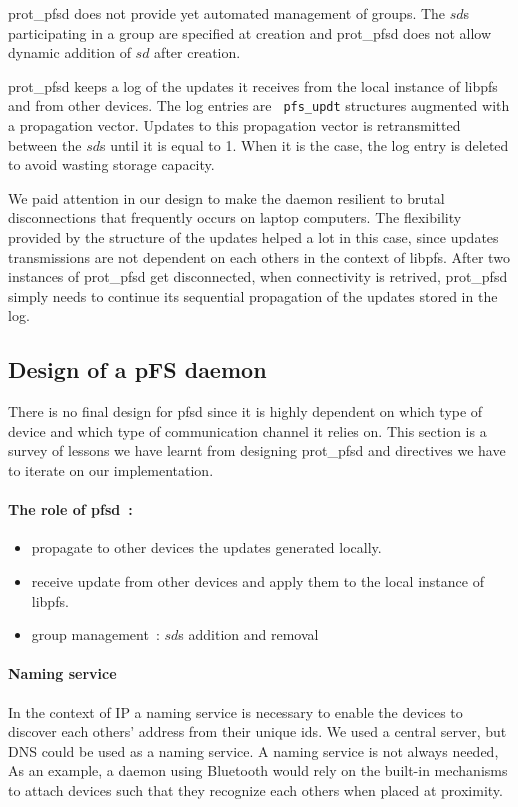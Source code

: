 prot\_pfsd does not provide yet automated management of groups. The
$sd$s participating in a group are specified at creation and
prot\_pfsd does not allow dynamic addition of $sd$ after creation.

prot\_pfsd keeps a log of the updates it receives from the local
instance of libpfs and from other devices. The log entries are {\tt
  pfs\_updt} structures augmented with a propagation vector. Updates
to this propagation vector is retransmitted between the $sd$s until it
is equal to 1. When it is the case, the log entry is deleted to avoid
wasting storage capacity.

We paid attention in our design to make the daemon resilient to brutal
disconnections that frequently occurs on laptop computers. The
flexibility provided by the structure of the updates helped a lot in
this case, since updates transmissions are not dependent on each
others in the context of libpfs. After two instances of prot\_pfsd get
disconnected, when connectivity is retrived, prot\_pfsd simply needs
to continue its sequential propagation of the updates stored in the
log.

\subsection {Design of a pFS daemon}
\label {subsec:depfsd}

There is no final design for pfsd since it is highly dependent on
which type of device and which type of communication channel it relies
on. This section is a survey of lessons we have learnt from designing
prot\_pfsd and directives we have to iterate on our implementation.

\paragraph {The role of pfsd~:}
\begin{itemize}
\item propagate to other devices the updates generated locally.
\item receive update from other devices and apply them to the local
  instance of libpfs.
\item group management~: $sd$s addition and removal
\end{itemize}

\paragraph {Naming service}
In the context of IP a naming service is necessary to enable the
devices to discover each others' address from their unique ids. We
used a central server, but DNS could be used as a naming service. A
naming service is not always needed, As an example, a daemon using
Bluetooth would rely on the built-in mechanisms to attach devices such
that they recognize each others when placed at proximity.

